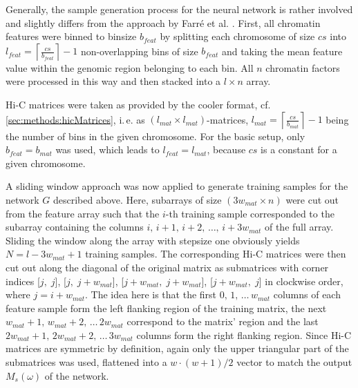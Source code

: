 Generally, the sample generation process for the neural network is rather involved and slightly differs from the approach by Farr\'e et al. \cite{Farre2018a}.
First, all chromatin features were binned to binsize $b_{feat}$ by splitting each chromosome of size $cs$ into 
$l_{feat}=\left \lceil{\frac{cs}{b_{feat}}}\right \rceil -1$ non-overlapping bins of size $b_{feat}$
and taking the mean feature value within the genomic region belonging to each bin.
All $n$ chromatin factors were processed in this way and then stacked into a $l \times n$ array.

Hi-C matrices were taken as provided by the cooler format, cf. \cref{sec:methods:hicMatrices}, 
i.\,e. as $(l_{mat} \times l_{mat})$-matrices, $l_{mat}=\left \lceil{\frac{cs}{b_{mat}}}\right \rceil -1$ being the number of bins in the given chromosome. 
For the basic setup, only $b_{feat} = b_{mat}$ was used, which leads to $l_{feat} = l_{mat}$, because $cs$ is a constant for a given chromosome.

A sliding window approach was now applied to generate training samples for the network $G$ described above.
Here, subarrays of size $(3w_{mat} \times n)$ were cut out from the feature array 
such that the $i$-th training sample corresponded to the subarray containing the columns $i,\,i+1,\,i+2,\,\dots,\,i+3w_{mat}$ of the full array. 
Sliding the window along the array with stepsize one obviously yields $N=l-3w_{mat}+1$ training samples.
The corresponding Hi-C matrices were then cut out along the diagonal of the original matrix 
as submatrices with corner indices [$j,\;j$], [$j,\;j+w_{mat}$], [$j+w_{mat},\;j+w_{mat}$], [$j+w_{mat},\;j$] in clockwise order, where $j=i+w_{mat}$.
The idea here is that the first $0,\,1,\,\dots \,w_{mat}$ columns of each feature sample form the left flanking region of the training matrix, 
the next $w_{mat}+1,\,w_{mat}+2,\,\dots \,2w_{mat}$ correspond to the matrix' region and the last $2w_{mat}+1,\,2w_{mat}+2,\,\dots \,3w_{mat}$ columns form the right flanking region.
Since Hi-C matrices are symmetric by definition, again only the upper triangular part of the submatrices was used, 
flattened into a $w\cdot (w+1)/2$ vector to match the output $M_s(\omega)$ of the network.

